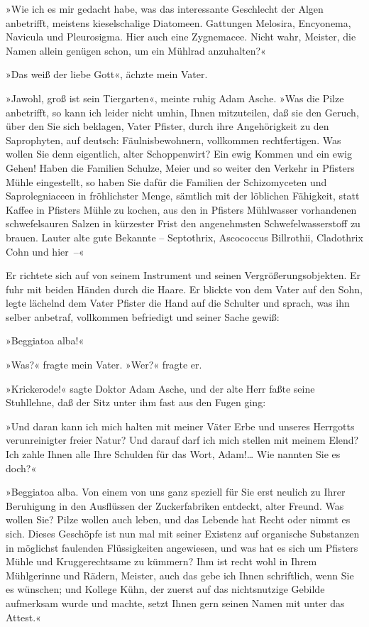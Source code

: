 »Wie ich es mir gedacht habe, was das interessante Geschlecht der
Algen anbetrifft, meistens kieselschalige Diatomeen. Gattungen
Melosira, Encyonema, Navicula und Pleurosigma. Hier auch eine
Zygnemacee. Nicht wahr, Meister, die Namen allein genügen schon, um
ein Mühlrad anzuhalten?«

»Das weiß der liebe Gott«, ächzte mein Vater.

»Jawohl, groß ist sein Tiergarten«, meinte ruhig Adam Asche. »Was
die Pilze anbetrifft, so kann ich leider nicht umhin, Ihnen
mitzuteilen, daß sie den Geruch, über den Sie sich beklagen, Vater
Pfister, durch ihre Angehörigkeit zu den Saprophyten, auf deutsch:
Fäulnisbewohnern, vollkommen rechtfertigen. Was wollen Sie denn
eigentlich, alter Schoppenwirt? Ein ewig Kommen und ein ewig Gehen!
Haben die Familien Schulze, Meier und so weiter den Verkehr in
Pfisters Mühle eingestellt, so haben Sie dafür die Familien der
Schizomyceten und Saprolegniaceen in fröhlichster Menge, sämtlich
mit der löblichen Fähigkeit, statt Kaffee in Pfisters Mühle zu
kochen, aus den in Pfisters Mühlwasser vorhandenen schwefelsauren
Salzen in kürzester Frist den angenehmsten Schwefelwasserstoff zu
brauen. Lauter alte gute Bekannte – Septothrix, Ascococcus
Billrothii, Cladothrix Cohn und hier~–«

Er richtete sich auf von seinem Instrument und seinen
Vergrößerungsobjekten. Er fuhr mit beiden Händen durch die Haare.
Er blickte von dem Vater auf den Sohn, legte lächelnd dem Vater
Pfister die Hand auf die Schulter und sprach, was ihn selber
anbetraf, vollkommen befriedigt und seiner Sache gewiß:

»Beggiatoa alba!«

»Was?« fragte mein Vater. »Wer?« fragte er.

»Krickerode!« sagte Doktor Adam Asche, und der alte Herr faßte
seine Stuhllehne, daß der Sitz unter ihm fast aus den Fugen ging:

»Und daran kann ich mich halten mit meiner Väter Erbe und unseres
Herrgotts verunreinigter freier Natur? Und darauf darf ich mich
stellen mit meinem Elend? Ich zahle Ihnen alle Ihre Schulden für
das Wort, Adam!\ldots{} Wie nannten Sie es doch?«

»Beggiatoa alba. Von einem von uns ganz speziell für Sie erst
neulich zu Ihrer Beruhigung in den Ausflüssen der Zuckerfabriken
entdeckt, alter Freund. Was wollen Sie? Pilze wollen auch leben,
und das Lebende hat Recht oder nimmt es sich. Dieses Geschöpfe ist
nun mal mit seiner Existenz auf organische Substanzen in möglichst
faulenden Flüssigkeiten angewiesen, und was hat es sich um Pfisters
Mühle und Kruggerechtsame zu kümmern? Ihm ist recht wohl in Ihrem
Mühlgerinne und Rädern, Meister, auch das gebe ich Ihnen
schriftlich, wenn Sie es wünschen; und Kollege Kühn, der zuerst auf
das nichtsnutzige Gebilde aufmerksam wurde und machte, setzt Ihnen
gern seinen Namen mit unter das Attest.«

